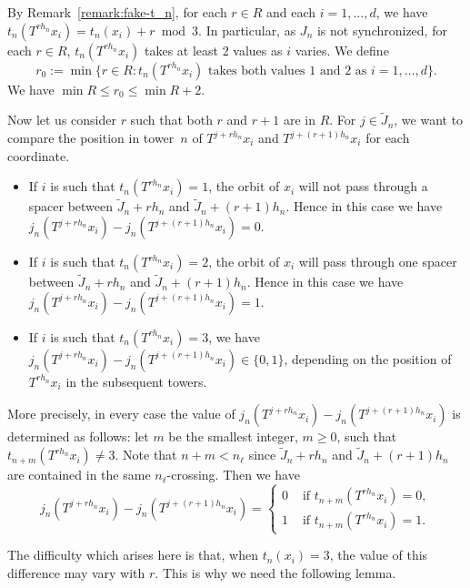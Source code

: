 \documentclass[10pt]{amsart}
\theoremstyle{definition}\newtheorem{defi}[theo]{Definition}\newtheorem{rema}[theo]{Remark}\newtheorem{exam}[theo]{Example}\newtheorem{exem}[theo]{Example}\newtheorem{nota}[theo]{Notation}
\begin{document}
By Remark~\ref{remark:fake-t_n}, for each $r\in R$ and each $i=1,\ldots,d$, we have $t_n(T^{rh_n}x_i)=t_n(x_i)+r\bmod 3$. In particular, as $J_n$ is not synchronized, for each $r\in R$, $t_n(T^{rh_n}x_i)$ takes at least 2 values as $i$ varies. We define
\[
r_0:=\min \{r\in R: t_n(T^{rh_n}x_i)\text{ takes both values 1 and 2 as }i=1,\ldots,d\}.
\]
We have $\min R\le r_0\le \min R+2$.

Now let us consider $r$ such that both $r$ and $r+1$ are in $R$. For $j\in\tilde J_n$, we want to compare the position in tower~$n$ of $T^{j+rh_n}x_i$ and $T^{j+(r+1)h_n}x_i$ for each coordinate.
\begin{itemize}
\item If $i$ is such that $t_n(T^{rh_n}x_i)=1$, the orbit of $x_i$ will not pass through a spacer between $\tilde J_n+rh_n$ and $\tilde J_n+(r+1)h_n$. Hence in this case we have $j_n(T^{j+rh_n}x_i)-j_n(T^{j+(r+1)h_n}x_i)=0$.
\item If $i$ is such that $t_n(T^{rh_n}x_i)=2$, the orbit of $x_i$ will pass through one spacer between $\tilde J_n+rh_n$ and $\tilde J_n+(r+1)h_n$. Hence in this case we have $j_n(T^{j+rh_n}x_i)-j_n(T^{j+(r+1)h_n}x_i)=1$.
\item If $i$ is such that $t_n(T^{rh_n}x_i)=3$, we have $j_n(T^{j+rh_n}x_i)-j_n(T^{j+(r+1)h_n}x_i)\in\{0,1\}$, depending on the position of $T^{rh_n}x_i$ in the subsequent towers.
\end{itemize}
More precisely, in every case the value of $j_n(T^{j+rh_n}x_i)-j_n(T^{j+(r+1)h_n}x_i)$ is determined as follows: let $m$ be the smallest integer, $m\ge 0$, such that $t_{n+m}(T^{rh_n}x_i)\neq 3$. Note that $n+m<n_\ell$ since $\tilde J_n+rh_n$ and $\tilde J_n+(r+1)h_n$ are contained in the same $n_\ell$-crossing. Then we have
\begin{equation}\label{eq:how_to_decide}
j_n(T^{j+rh_n}x_i)-j_n(T^{j+(r+1)h_n}x_i)=
\begin{cases}
0 & \text{ if }t_{n+m}(T^{rh_n}x_i)=0,\\
1 & \text{ if }t_{n+m}(T^{rh_n}x_i)=1.
\end{cases}
\end{equation}

The difficulty which arises here is that, when $t_n(x_i)=3$, the value of this difference may vary with $r$. This is why we need the following lemma.
\end{document}
